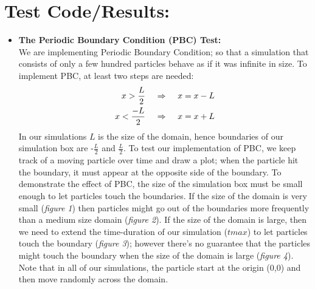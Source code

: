 \documentclass[a4paper,11pt]{article}
\newcommand\tab[1][4mm]{\hspace*{#1}}
\begin{document}
\section*{Test Code/Results:}
\begin{itemize}
\item\textbf{The Periodic Boundary Condition (PBC) Test:} \\
We are implementing Periodic Boundary Condition; so that a simulation that consists of only a few hundred particles behave as if it was infinite in size. To implement PBC, at least two steps are needed:
\begin{align*}
  x > \frac{L}{2} \tab \Rightarrow \tab x = x - L  \\
  x < \frac{-L}{2} \tab \Rightarrow \tab x = x + L
\end{align*}
In our simulations \(L\) is the size of the domain, hence boundaries of our simulation box are -\(\frac{L}{2}\) and \(\frac{L}{2}\). To test our implementation of PBC, we keep track of a moving particle over time and draw a plot; when the particle hit the boundary, it must appear at the opposite side of the boundary. To demonstrate the effect of PBC, the size of the simulation box must be small enough to let particles touch the boundaries. If the size of the domain is very small (\emph{figure 1}) then particles might go out of the boundaries more frequently than a medium size domain (\emph{figure 2}). If the size of the domain is large, then we need to extend the time-duration of our simulation (\(tmax\)) to let particles touch the boundary (\emph{figure 3}); however there's no guarantee that the particles might touch the boundary when the size of the domain is large (\emph{figure 4}). Note that in all of our simulations, the particle start at the origin (0,0) and then move randomly across the domain.


\end{itemize}
\end{document}
